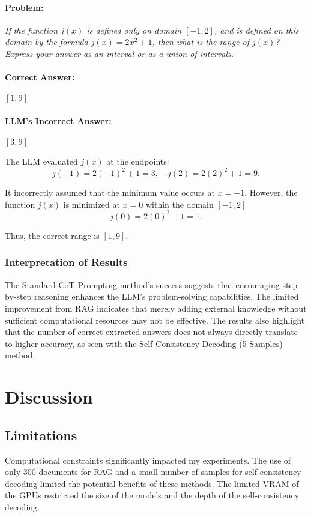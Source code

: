 \documentclass[11pt,a4paper]{article}
\begin{document}
\paragraph{Problem:} \textit{If the function \( j(x) \) is defined only on domain \( [-1, 2] \), and is defined on this domain by the formula \( j(x) = 2x^2 + 1 \), then what is the range of \( j(x) \)? Express your answer as an interval or as a union of intervals.}

\paragraph{Correct Answer:} \( [1, 9] \)

\paragraph{LLM's Incorrect Answer:} \( [3, 9] \)

\begin{tcolorbox}[colback=gray!10, colframe=black, title=\textbf{Step-by-Step Analysis}, fonttitle=\bfseries]
\footnotesize
The LLM evaluated \( j(x) \) at the endpoints:
\[
j(-1) = 2(-1)^2 + 1 = 3, \quad j(2) = 2(2)^2 + 1 = 9.
\]

It incorrectly assumed that the minimum value occurs at \( x = -1 \). However, the function \( j(x) \) is minimized at \( x = 0 \) within the domain \( [-1, 2] \)
\[
j(0) = 2(0)^2 + 1 = 1.
\]

Thus, the correct range is \( [1, 9] \).
\end{tcolorbox}

\subsubsection{Interpretation of Results}
The Standard CoT Prompting method's success suggests that encouraging step-by-step reasoning enhances the LLM's problem-solving capabilities. The limited improvement from RAG indicates that merely adding external knowledge without sufficient computational resources may not be effective. The results also highlight that the number of correct extracted answers does not always directly translate to higher accuracy, as seen with the Self-Consistency Decoding (5 Samples) method.

\section{Discussion}
\subsection{Limitations}
Computational constraints significantly impacted my experiments. The use of only 300 documents for RAG and a small number of samples for self-consistency decoding limited the potential benefits of these methods. The limited VRAM of the GPUs restricted the size of the models and the depth of the self-consistency decoding.
\end{document}
